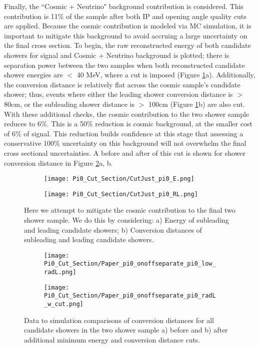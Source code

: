 Finally, the ``Cosmic + Neutrino" background contribution is considered. This contribution is 11\% of the sample after both IP and opening angle quality cuts are applied. Because the cosmic contribution is modeled via MC simulation, it is important to mitigate this background to avoid accruing a large uncertainty on the final cross section.  To begin, the raw reconstructed energy of both candidate showers for signal and Cosmic + Neutrino background is plotted; there is separation power between the two samples when both reconstructed candidate shower energies are $<$ 40 MeV, where a cut is imposed (Figure \ref{fig:cutjust_pi0_e}a).  Additionally, the conversion distance is relatively flat across the cosmic sample's candidate shower; thus, events where either the leading shower conversion distance is $>$ 80cm, or the subleading shower distance is $>$ 100cm (Figure \ref{fig:cutjust_pi0_e}b) are also cut. With these additional checks, the cosmic contribution to the two shower sample reduces to 6\%. This is a 50\% reduction is cosmic background, at the smaller cost of 6\% of signal. This reduction builds confidence at this stage that assessing a conservative 100\% uncertainty on this background will not overwhelm the final cross sectional uncertainties. A before and after of this cut is shown for shower conversion distance in Figure \ref{fig:physics_radl_before_after}a, b.


\begin{figure}[H]
\centering
  \begin{subfigure}[t]{0.4\textwidth}
    \centering
\texttt{[image: Pi0\_Cut\_Section/CutJust\_pi0\_E.png]}
  \caption{ }
  \end{subfigure} 
  \hspace{20mm}
  \begin{subfigure}[t]{0.4\textwidth}
    \centering
\texttt{[image: Pi0\_Cut\_Section/CutJust\_pi0\_RL.png]}
  \caption{ }
  \end{subfigure} 
\caption{ Here we attempt to mitigate the cosmic contribution to the final two shower sample. We do this by considering: a) Energy of subleading and leading candidate showers; b) Conversion distances of subleading and leading candidate showers. }
\label{fig:cutjust_pi0_e}
\end{figure}

\begin{figure}[H]
  \begin{subfigure}[t]{0.4\textwidth}
\texttt{[image: Pi0\_Cut\_Section/Paper\_pi0\_onoffseparate\_pi0\_low\_radL.png]}
  \caption{ }
  \end{subfigure} 
  \hspace{10mm}
  \begin{subfigure}[t]{0.4\textwidth}
\texttt{[image: Pi0\_Cut\_Section/Paper\_pi0\_onoffseparate\_pi0\_radL\_w\_cut.png]}
  \caption{ }
  \end{subfigure} 
\caption{ Data to simulation comparisons of conversion distances for all candidate showers in the two shower sample a) before and b) after additional minimum energy and conversion distance cuts. }
\label{fig:physics_radl_before_after}
\end{figure}

